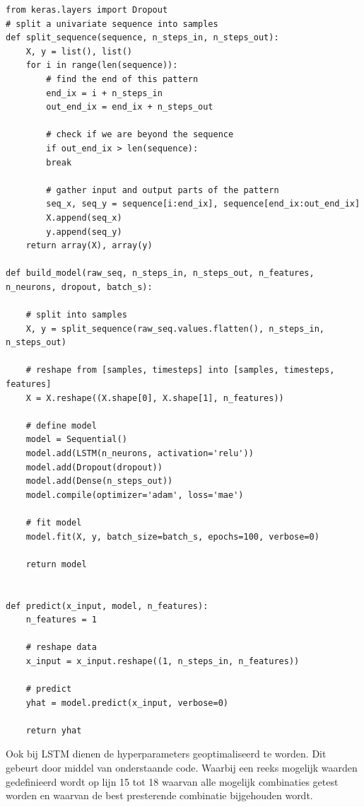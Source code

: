 \begin{verbatim}
from keras.layers import Dropout
# split a univariate sequence into samples
def split_sequence(sequence, n_steps_in, n_steps_out):
    X, y = list(), list()
    for i in range(len(sequence)):
        # find the end of this pattern
        end_ix = i + n_steps_in
        out_end_ix = end_ix + n_steps_out
        
        # check if we are beyond the sequence
        if out_end_ix > len(sequence):
        break
        
        # gather input and output parts of the pattern
        seq_x, seq_y = sequence[i:end_ix], sequence[end_ix:out_end_ix]
        X.append(seq_x)
        y.append(seq_y)
    return array(X), array(y)

def build_model(raw_seq, n_steps_in, n_steps_out, n_features, n_neurons, dropout, batch_s):

    # split into samples
    X, y = split_sequence(raw_seq.values.flatten(), n_steps_in, n_steps_out)
    
    # reshape from [samples, timesteps] into [samples, timesteps, features]
    X = X.reshape((X.shape[0], X.shape[1], n_features))
    
    # define model
    model = Sequential()
    model.add(LSTM(n_neurons, activation='relu'))
    model.add(Dropout(dropout))
    model.add(Dense(n_steps_out))
    model.compile(optimizer='adam', loss='mae')
    
    # fit model
    model.fit(X, y, batch_size=batch_s, epochs=100, verbose=0)
    
    return model


def predict(x_input, model, n_features):
    n_features = 1
    
    # reshape data
    x_input = x_input.reshape((1, n_steps_in, n_features))
    
    # predict
    yhat = model.predict(x_input, verbose=0)
    
    return yhat
\end{verbatim}

Ook bij LSTM dienen de hyperparameters geoptimaliseerd te worden. Dit gebeurt door middel van onderstaande code. Waarbij een reeks mogelijk waarden gedefinieerd wordt op lijn 15 tot 18 waarvan alle mogelijk combinaties getest worden en waarvan de best presterende combinatie bijgehouden wordt.

